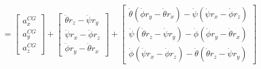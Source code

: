 \begin{align*}
&=\begin{bmatrix}a_{x}^{CG} \\ a_{y}^{CG} \\ a_{z}^{CG}\end{bmatrix}%
+\begin{bmatrix}\ddot{\theta}r_z - \ddot{\psi}r_y \\\ddot{\psi}r_x - \ddot{\phi}r_z \\\ddot{\phi}r_y - \ddot{\theta}r_x\end{bmatrix}%
+\begin{bmatrix}\dot{\theta}(\dot{\phi}r_y - \dot{\theta}r_x) - \dot{\psi}(\dot{\psi}r_x - \dot{\phi}r_z)\\\dot{\psi}(\dot{\theta}r_z - \dot{\psi}r_y) - \dot{\phi}(\dot{\phi}r_y - \dot{\theta}r_x)\\\dot{\phi}(\dot{\psi}r_x - \dot{\phi}r_z) - \dot{\theta}(\dot{\theta}r_z - \dot{\psi}r_y)\end{bmatrix}%
\end{align*}
